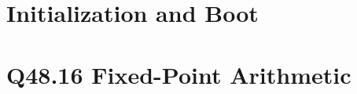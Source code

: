 \section{Initialization and Boot}
\label{vol1:sec:interp:boot}


\section{Q48.16 Fixed-Point Arithmetic}
\label{vol1:sec:interp:q4816}

